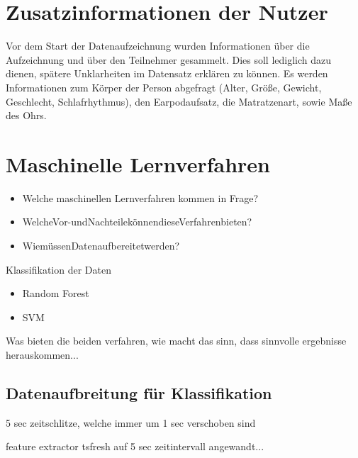 \section{Zusatzinformationen der Nutzer}
\label{ch:sa:additionalUserStudiesInformation}
Vor dem Start der Datenaufzeichnung wurden Informationen über die Aufzeichnung und über den Teilnehmer gesammelt. 
Dies soll lediglich dazu dienen, spätere Unklarheiten im Datensatz erklären zu können.
Es werden Informationen zum Körper der Person abgefragt (Alter, Größe, Gewicht, Geschlecht, Schlafrhythmus), den Earpodaufsatz, die Matratzenart, sowie Maße des Ohrs.


\section{Maschinelle Lernverfahren}
\label{ch:sa:machine_learning}
\begin{itemize}
    \item Welche maschinellen Lernverfahren kommen in Frage?
    \item WelcheVor-undNachteilekönnendieseVerfahrenbieten? 
    \item WiemüssenDatenaufbereitetwerden?
\end{itemize}

Klassifikation der Daten
\begin{itemize}
    \item Random Forest
    \item SVM
\end{itemize}

Was bieten die beiden verfahren, wie macht das sinn, dass sinnvolle ergebnisse herauskommen...

\subsection{Datenaufbreitung für Klassifikation}
\label{ch:sa:machine_learning:data_handling}

5 sec zeitschlitze, welche immer um 1 sec verschoben sind

feature extractor tsfresh auf 5 sec zeitintervall angewandt...

